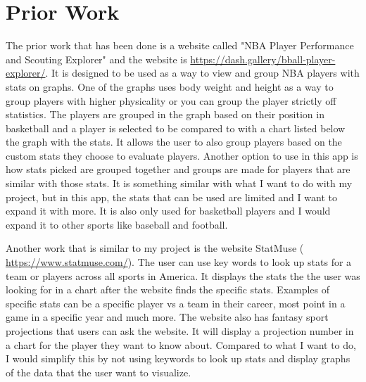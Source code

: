 \documentclass[10pt,twocolumn,letterpaper]{article}
\begin{document}

\section{Prior Work}
\label{sec:prior work}

The prior work that has been done is a website called "NBA Player Performance and Scouting Explorer" and the website is \url{https://dash.gallery/bball-player-explorer/}. It is designed to be used as a way to view and group NBA players with stats on graphs. One of the graphs uses body weight and height as a way to group players with higher physicality or you can group the player strictly off statistics. The players are grouped in the graph based on their position in basketball and a player is selected to be compared to with a chart listed below the graph with the stats. It allows the user to also group players based on the custom stats they choose to evaluate players. Another option to use in this app is how stats picked are grouped together and groups are made for players that are similar with those stats. It is something similar with what I want to do with my project, but in this app, the stats that can be used are limited and I want to expand it with more. It is also only used for basketball players and I would expand it to other sports like baseball and football. 

Another work that is similar to my project is the website StatMuse ( \url{https://www.statmuse.com/}). The user can use key words to look up stats for a team or players across all sports in America. It displays the stats the the user was looking for in a chart after the website finds the specific stats. Examples of specific stats can be a specific player vs a team in their career, most point in a game in a specific year and much more. The website also has fantasy sport projections that users can ask the website. It will display a projection number in a chart for the player they want to know about. Compared to what I want to do, I would simplify this by not using keywords to look up stats and display graphs of the data that the user want to visualize.
\end{document}
